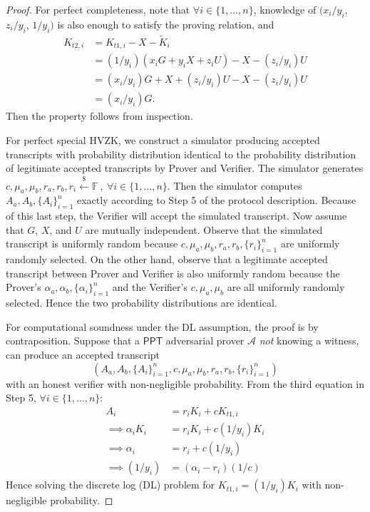 \documentclass{article}
\begin{document}
\begin{proof}
For perfect completeness, note that $\forall i\in\{1,\ldots,n\}$, knowledge of $(x_i/y_i$, $z_i/y_i$, $1/y_i)$ is also enough to satisfy the proving relation, and
\begin{align*}
K_{t2,i} &= K_{t1,i} - X - \tilde{K}_i \\ &= (1/y_i)(x_i G + y_i X + z_i U) - X - (z_i/y_i)U \\
&= (x_i/y_i)G + X + (z_i/y_i) U - X - (z_i/y_i)U \\ &= (x_i/y_i)G.
\end{align*}
Then the property follows from inspection.

For perfect special HVZK, we construct a simulator producing accepted transcripts with probability distribution identical to the probability distribution of legitimate accepted transcripts by Prover and Verifier. The simulator generates $c, \mu_a, \mu_b, r_a, r_b, r_i \xleftarrow{\$}\mathbb{F}\ ,\ \forall i\in\{1,\ldots,n\}$. Then the simulator computes $A_{a}, A_{b}, \{A_{i}\}_{i=1}^n$ exactly according to Step 5 of the protocol description. Because of this last step, the Verifier will accept the simulated transcript. Now assume that $G$, $X$, and $U$ are mutually independent. Observe that the simulated transcript is uniformly random because $c, \mu_a, \mu_b, r_a, r_b, \{r_i\}_{i=1}^n$ are uniformly randomly selected. On the other hand, observe that a legitimate accepted transcript between Prover and Verifier is also uniformly random because the Prover's $\alpha_a, \alpha_b, \{\alpha_i\}_{i=1}^n$ and the Verifier's $c, \mu_a, \mu_b$ are all uniformly randomly selected. Hence the two probability distributions are identical.

For computational soundness under the DL assumption, the proof is by contraposition. Suppose that a $\textsf{PPT}$ adversarial prover $\mathcal{A}$ \textit{not} knowing a witness, can produce an accepted transcript $$(A_a, A_b, \{A_i\}_{i=1}^n,c, \mu_a, \mu_b, r_a, r_b, \{r_i\}_{i=1}^n)$$ with an honest verifier with non-negligible probability. From the third equation in Step 5, $\forall i\in\{1,\ldots,n\}$:
\begin{align*}
A_{i} &= r_i K_i + c K_{t1,i} \\
\implies\alpha_i K_i &= r_i K_i + c (1/y_i)K_i \\
\implies\alpha_i &= r_i + c(1/y_i) \\
\implies(1/y_i) &= (\alpha_i - r_i)(1/c)
\end{align*}
Hence solving the discrete log (DL) problem for $K_{t1,i} = (1/y_i)K_i$ with non-negligible probability.
\end{proof}
\end{document}
